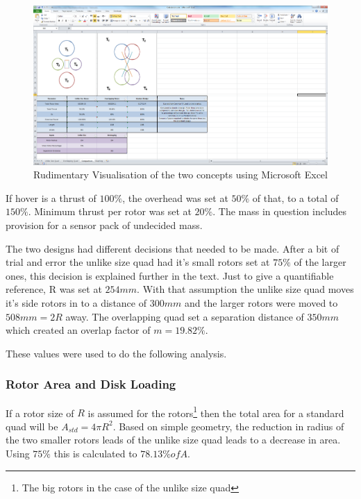 \begin{figure}[H]
\centering
\includegraphics[width = 15cm]{Images/Design/Excel}
\caption{Rudimentary Visualisation of the two concepts using Microsoft Excel\texttrademark}
\label{IM_Excel}
\end{figure}

If hover is a thrust of $100\%$, the overhead was set at $50\%$  of that, to a total of $150\%$. Minimum thrust per rotor was set at $20\%$. The mass in question includes provision for a sensor pack of undecided mass. 

The two designs had different decisions that needed to be made. After a bit of trial and error the unlike size quad had it's small rotors set at $75\%$ of the larger ones, this decision is explained further in the text. Just to give a quantifiable reference, R was set at $254mm$. With that assumption the unlike size quad moves it's side rotors in to a distance of $300mm$ and the larger rotors were moved to $508mm = 2R$ away. The overlapping quad set a separation distance of $350mm$ which created an overlap factor of $m = 19.82\%$. 

These values were used to do the following analysis.


\subsubsection{Rotor Area and Disk Loading}
If a rotor size of $R$ is assumed for the rotors\footnote{The big rotors in the case of the unlike size quad} then the total area for a standard quad will be $A_{std} = 4 \pi R^2$. Based on simple geometry, the reduction in radius of the two smaller rotors leads of the unlike size quad leads to a decrease in area. Using $75\%$ this is calculated to $78.13\% of A$. 

